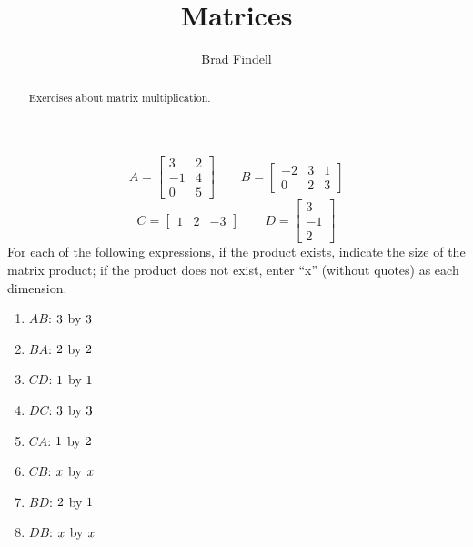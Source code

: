 \documentclass[handout]{ximera}
\title{Matrices}
\author{Brad Findell}
\begin{document}
\begin{abstract}
Exercises about matrix multiplication.  
\end{abstract}
\maketitle

\begin{exercise}

\[
A = \begin{bmatrix}  3   &  2\\   -1  &  4\\   0   &  5 \end{bmatrix} \qquad
B = \begin{bmatrix}   -2  &  3  &  1\\  0  &  2  &  3 \end{bmatrix}
\]
\[
C = \begin{bmatrix}  1  &   2 &   -3\end{bmatrix} \qquad
D = \begin{bmatrix} 3\\  -1\\ 2  \end{bmatrix}
\]
For each of the following expressions, if the product exists, indicate the size of the matrix product; if the product does not exist, enter ``x'' (without quotes) as each dimension. 
\begin{enumerate}
\item $AB$: ${3}$ by ${3}$
\item $BA$: ${2}$ by ${2}$
\item $CD$: ${1}$ by ${1}$
\item $DC$: ${3}$ by ${3}$
\item $CA$: ${1}$ by ${2}$
\item $CB$: ${x}$ by ${x}$
\item $BD$: ${2}$ by ${1}$
\item $DB$: ${x}$ by ${x}$ 
\end{enumerate}


\end{exercise}
\end{document}
